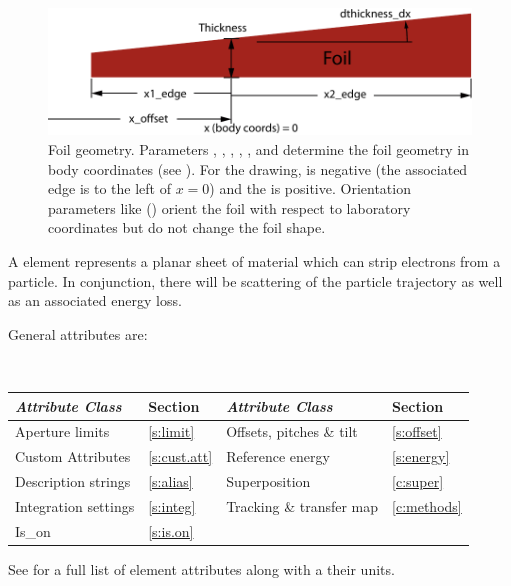 \begin{figure}[tb]
  \centering
  \includegraphics[width=5in]{foil.pdf}
  \caption[Foil geometry.]
{Foil geometry. Parameters , , , ,
, and  determine the foil geometry in body coordinates (see ).
For the drawing,  is negative (the associated edge is to the left of $x = 0$) and the
 is positive.  Orientation parameters like  () orient the
foil with respect to laboratory coordinates but do not change the foil shape.}
  \label{f:foil}
\end{figure}

A  element represents a planar sheet of material which can strip electrons from a particle.
In conjunction, there will be scattering of the particle trajectory as well as an associated energy
loss.

General  attributes are:
\begin{center}
\tt
\begin{tabular}{llll} \toprule
  {\sl Attribute Class}      & Section           & {\sl Attribute Class}      & Section            \\ \midrule
  Aperture limits            & \ref{s:limit}     & Offsets, pitches \& tilt   & \ref{s:offset}     \\
  Custom Attributes          & \ref{s:cust.att}  & Reference energy           & \ref{s:energy}     \\ 
  Description strings        & \ref{s:alias}     & Superposition              & \ref{c:super}      \\
  Integration settings       & \ref{s:integ}     & Tracking \& transfer map   & \ref{c:methods}    \\ 
  Is_on                      & \ref{s:is.on}     &                            &                    \\
  \bottomrule
\end{tabular}
\end{center}
\toffset
See  for a full list of element attributes along with a their units.

